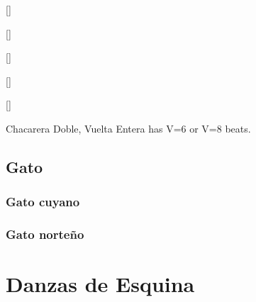 	\hspace*{\fill}
	[\athird\linewidth]{
		\begin{cuadrodebaile}[scale=\scalethree]
			\primeracolocacionb[draw]
			\rhombob
		\end{cuadrodebaile}
	}
	[\athird\linewidth]{
		\begin{cuadrodebaile}[scale=\scalethree]
			\primeracolocacionb[draw]
			\giros
		\end{cuadrodebaile}
	}
	[\athird\linewidth]{
		\begin{cuadrodebaile}[scale=\scalethree]
			\primeracolocacionb[draw]
			\mediavueltaa[>-]\mediavueltab[>-]
		\end{cuadrodebaile}
	}
	\hspace*{\fill}

	\hspace*{\fill}
	[\athird\linewidth]{
		\begin{cuadrodebaile}[scale=\scalethree]
			\primeracolocaciont[draw]
			\rhombob
		\end{cuadrodebaile}
	}
	[\athird\linewidth]{
		\begin{cuadrodebaile}[scale=\scalethree]
			\primeracolocaciont[draw]
			\girofinala\girofinalb
		\end{cuadrodebaile}
	}
	\hspace*{\fill}
	\caption{Chacarera Doble, Vuelta Entera has V=6 or V=8 beats.}
	\label{fig:chacarera:doble}
\endgroup

\section{Gato}
\label{sec:gato}

\subsection{Gato cuyano}
\label{subsec:gato_cuyano}

\subsection{Gato norteño}
\label{subsec:gato_norteno}

\chapter{Danzas de Esquina}
\label{chap:esquinas}



